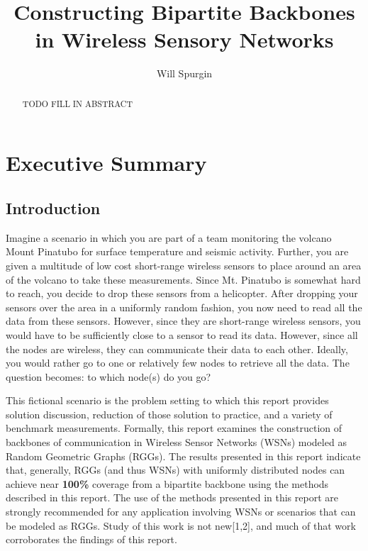 \documentclass[]{elsarticle} %
\begin{document}
\begin{frontmatter}

  \title{Constructing Bipartite Backbones in Wireless Sensory Networks}
    \author[Southern Methodist University - Bobby B. Lyle School of Engineering]{Will Spurgin}
  
    
  \begin{abstract}
  TODO FILL IN ABSTRACT
  \end{abstract}
  
 \end{frontmatter}

\section{Executive Summary}\label{executive-summary}

\subsection{Introduction}\label{introduction}

Imagine a scenario in which you are part of a team monitoring the
volcano Mount Pinatubo for surface temperature and seismic activity.
Further, you are given a multitude of low cost short-range wireless
sensors to place around an area of the volcano to take these
measurements. Since Mt. Pinatubo is somewhat hard to reach, you decide
to drop these sensors from a helicopter. After dropping your sensors
over the area in a uniformly random fashion, you now need to read all
the data from these sensors. However, since they are short-range
wireless sensors, you would have to be sufficiently close to a sensor to
read its data. However, since all the nodes are wireless, they can
communicate their data to each other. Ideally, you would rather go to
one or relatively few nodes to retrieve all the data. The question
becomes: to which node(s) do you go?

This fictional scenario is the problem setting to which this report
provides solution discussion, reduction of those solution to practice,
and a variety of benchmark measurements. Formally, this report examines
the construction of backbones of communication in Wireless Sensor
Networks (WSNs) modeled as Random Geometric Graphs (RGGs). The results
presented in this report indicate that, generally, RGGs (and thus WSNs)
with uniformly distributed nodes can achieve near \textbf{100\%}
coverage from a bipartite backbone using the methods described in this
report. The use of the methods presented in this report are strongly
recommended for any application involving WSNs or scenarios that can be
modeled as RGGs. Study of this work is not new{[}1,2{]}, and much of
that work corroborates the findings of this report.
\end{document}
